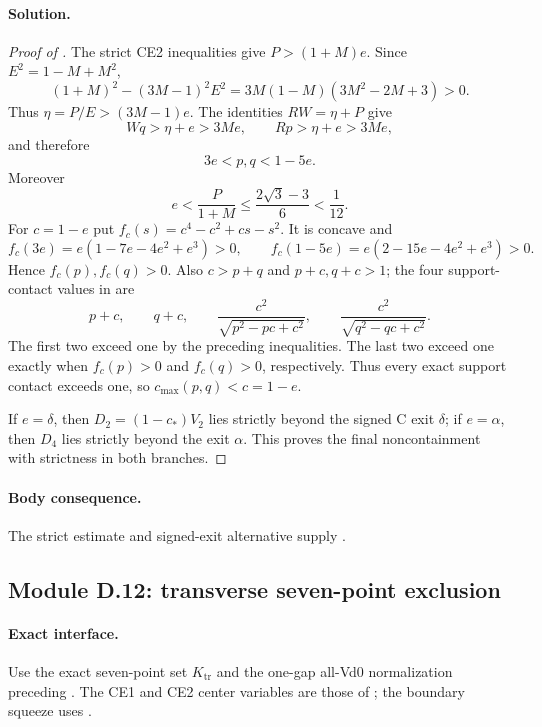 \paragraph{Solution.}

\begin{proof}[Proof of ]
The strict CE2 inequalities give $P>(1+M)e$.  Since
$E^2=1-M+M^2$,
\[
 (1+M)^2-(3M-1)^2E^2
 =3M(1-M)(3M^2-2M+3)>0.
\]
Thus $\eta=P/E>(3M-1)e$.  The identities $RW=\eta+P$ give
\[
 Wq>\eta+e>3Me,
 \qquad Rp>\eta+e>3Me,
\]
and therefore
\[
 3e<p,q<1-5e.
\]
Moreover
\[
 e<\frac{P}{1+M}\le\frac{2\sqrt3-3}{6}<\frac1{12}.
\]
For $c=1-e$ put $f_c(s)=c^4-c^2+cs-s^2$.  It is concave and
\[
 f_c(3e)=e(1-7e-4e^2+e^3)>0,
 \qquad
 f_c(1-5e)=e(2-15e-4e^2+e^3)>0.
\]
Hence $f_c(p),f_c(q)>0$.  Also $c>p+q$ and $p+c,q+c>1$; the four
support-contact values in  are
\[
 p+c,
 \qquad q+c,
 \qquad \frac{c^2}{\sqrt{p^2-pc+c^2}},
 \qquad \frac{c^2}{\sqrt{q^2-qc+c^2}}.
\]
The first two exceed one by the preceding inequalities.  The last two exceed
one exactly when $f_c(p)>0$ and $f_c(q)>0$, respectively.  Thus every exact
support contact exceeds one, so $c_{\max}(p,q)<c=1-e$.

If $e=\delta$, then $D_2=(1-c_*)V_2$ lies strictly beyond the signed C exit
$\delta$; if $e=\alpha$, then $D_4$ lies strictly beyond the exit $\alpha$.
This proves the final noncontainment with strictness in both branches.
\end{proof}

\paragraph{Body consequence.}
The strict estimate and signed-exit alternative supply
.

\subsection{Module D.12: transverse seven-point exclusion}

\paragraph{Exact interface.}
Use the exact seven-point set $K_{\mathrm{tr}}$ and the one-gap all-Vd0
normalization preceding .  The CE1 and CE2
center variables are those of ; the
boundary squeeze uses .

